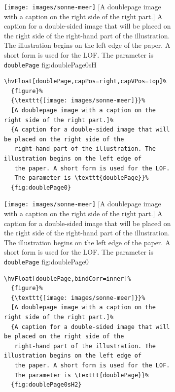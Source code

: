 \documentclass[twoside,paper=a4,usegeometry]{scrartcl}
\makeatletter
\let\hvBlindtext\Blindtext
\def\Blindtext{\par\color{black!40}\hvBlindtext\par\normalcolor}
\def\hvblindtext{\textcolor{black!40}{\blindtext@text}}
\makeatother
\begin{document}
\begin{figure}[p]
\begin{figure}[p]
\hvFloatSetDefaults

%
  {\texttt{[image: images/sonne-meer]}}%
  [A doublepage image with a caption on the right side of the right part.]%
  {A caption for a double-sided image that will be placed on the right side of the
   right-hand part of the illustration. The illustration begins on the left edge of 
   the paper. A short form is used for the LOF. 
   The parameter is \texttt{doublePage}}%
  {fig:doublePage0sH}

\Blindtext

\Blindtext

\hvblindtext




\begin{lstlisting}
\hvFloat[doublePage,capPos=right,capVPos=top]%
  {figure}%
  {\texttt{[image: images/sonne-meer]}}%
  [A doublepage image with a caption on the right side of the right part.]%
  {A caption for a double-sided image that will be placed on the right side of the
   right-hand part of the illustration. The illustration begins on the left edge of 
   the paper. A short form is used for the LOF. 
   The parameter is \texttt{doublePage}}%
  {fig:doublePage0}
\end{lstlisting}


\hvFloatSetDefaults

%
  {\texttt{[image: images/sonne-meer]}}%
  [A doublepage image with a caption on the right side of the right part.]%
  {A caption for a double-sided image that will be placed on the right side of the
   right-hand part of the illustration. The illustration begins on the left edge of 
   the paper. A short form is used for the LOF. 
   The parameter is \texttt{doublePage}}%
  {fig:doublePage0}

\Blindtext

\Blindtext

\Blindtext




\begin{lstlisting}
\hvFloat[doublePage,bindCorr=inner]%
  {figure}%
  {\texttt{[image: images/sonne-meer]}}%
  [A doublepage image with a caption on the right side of the right part.]%
  {A caption for a double-sided image that will be placed on the right side of the
   right-hand part of the illustration. The illustration begins on the left edge of 
   the paper. A short form is used for the LOF. 
   The parameter is \texttt{doublePage}}%
  {fig:doublePage0sH2}
\end{lstlisting}



\end{figure}
\end{figure}
\end{document}
